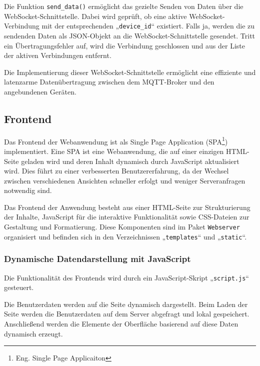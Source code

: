 \documentclass[12pt, letterpaper]{article}
\begin{document}
  \par Die Funktion \texttt{send\_data()} ermöglicht das gezielte Senden von Daten über die WebSocket-Schnittstelle. Dabei wird geprüft, ob eine aktive WebSocket-Verbindung mit der entsprechenden „\texttt{device\_id}“ existiert. Falls ja, werden die zu sendenden Daten als JSON-Objekt an die WebSocket-Schnittstelle gesendet. Tritt ein Übertragungsfehler auf, wird die Verbindung geschlossen und aus der Liste der aktiven Verbindungen entfernt.
  \par Die Implementierung dieser WebSocket-Schnittstelle ermöglicht eine effiziente und latenzarme Datenübertragung zwischen dem MQTT-Broker und den angebundenen Geräten.
  \subsection{Frontend}
  \par Das Frontend der Webanwendung ist als Single Page Application (SPA\footnote{Eng. Single Page Applicaiton}) implementiert. Eine SPA ist eine Webanwendung, die auf einer einzigen HTML-Seite geladen wird und deren Inhalt dynamisch durch JavaScript aktualisiert wird. Dies führt zu einer verbesserten Benutzererfahrung, da der Wechsel zwischen verschiedenen Ansichten schneller erfolgt und weniger Serveranfragen notwendig sind. 
  \par Das Frontend der Anwendung besteht aus einer HTML-Seite zur Strukturierung der Inhalte, JavaScript für die interaktive Funktionalität sowie CSS-Dateien zur Gestaltung und Formatierung. Diese Komponenten sind im Paket \texttt{Webserver} organisiert und befinden sich in den Verzeichnissen „\texttt{templates}“ und „\texttt{static}“.
  \par 
  \subsubsection{Dynamische Datendarstellung mit JavaScript}
  \par Die Funktionalität des Frontends wird durch ein JavaScript-Skript „\texttt{script.js}“ gesteuert.
  \par Die Benutzerdaten werden auf die Seite dynamisch dargestellt. Beim Laden der Seite werden die Benutzerdaten auf dem Server abgefragt und lokal gespeichert. Anschließend werden die Elemente der Oberfläche basierend auf diese Daten dynamisch erzeugt. 
\end{document}
